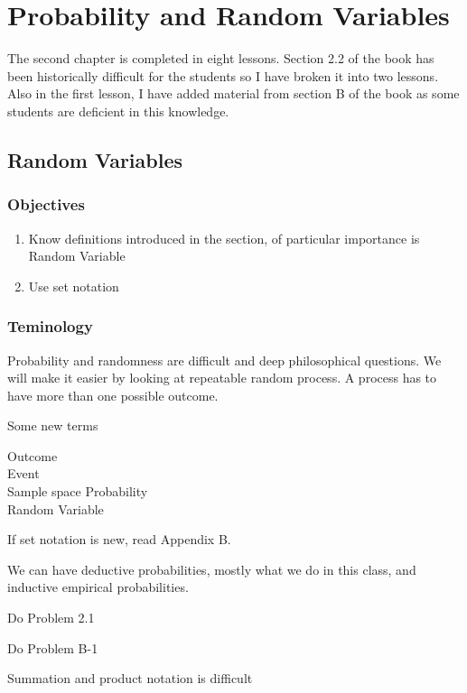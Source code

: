 \documentclass[]{book}
\providecommand{\tightlist}{%
  \setlength{\itemsep}{0pt}\setlength{\parskip}{0pt}}
\theoremstyle{definition}
\theoremstyle{definition}
\theoremstyle{definition}
\theoremstyle{remark}
\begin{document}
\chapter{Probability and Random Variables}\label{Chpt2}

The second chapter is completed in eight lessons. Section 2.2 of the
book has been historically difficult for the students so I have broken
it into two lessons. Also in the first lesson, I have added material
from section B of the book as some students are deficient in this
knowledge.

\hypertarget{L4}{\section{Random Variables}\label{L4}}

\subsection{Objectives}\label{objectives-3}

\begin{enumerate}
\def\labelenumi{\arabic{enumi}.}
\tightlist
\item
  Know definitions introduced in the section, of particular importance
  is Random Variable
\item
  Use set notation
\end{enumerate}

\subsection{Teminology}\label{teminology}

Probability and randomness are difficult and deep philosophical
questions. We will make it easier by looking at repeatable random
process. A process has to have more than one possible outcome.

Some new terms

Outcome\\
Event\\
Sample space Probability\\
Random Variable

If set notation is new, read Appendix B.

We can have deductive probabilities, mostly what we do in this class,
and inductive empirical probabilities.

Do Problem 2.1

Do Problem B-1

Summation and product notation is difficult
\end{document}
